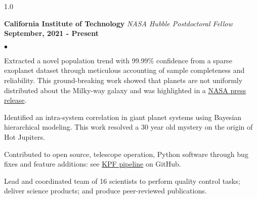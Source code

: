 \documentclass[margin,line, 12pt]{res}
\newenvironment{list2}{
  \begin{list}{$\bullet$}{%
      \setlength{\itemsep}{0.05in}
      \setlength{\parsep}{0in} \setlength{\parskip}{0in}
      \setlength{\topsep}{0.0in} \setlength{\partopsep}{0in}
      \setlength{\leftmargin}{0.2in}}}{\end{list}}
\begin{document}
\begin{spacing}{1.0}
\begin{resume}

\textbf{California Institute of Technology} \hfill \newline
\textit{NASA Hubble Postdoctoral Fellow} \hfill \textbf{September, 2021 - Present}\newline
    \begin{list2}
    	\vspace*{-5mm}
    	\item Extracted a novel population trend with 99.99\% confidence from a sparse exoplanet dataset through meticulous accounting of sample completeness and reliability. This ground-breaking work showed that planets are not uniformly distributed about the Milky-way galaxy and was highlighted in a \href{https://exoplanets.nasa.gov/news/1768/discovery-alert-on-our-galaxys-outskirts-a-poverty-of-planets/}{NASA press release}.
	
	\item Identified an intra-system correlation in giant planet systems using Bayesian hierarchical modeling. This work resolved a 30 year old mystery on the origin of Hot Jupiters.
	    	
	\item Contributed to open source, telescope operation, Python software through bug fixes and feature additions: see \href{https://github.com/California-Planet-Search/KPF-CPS}{KPF pipeline} on GitHub.
	
	\item Lead and coordinated team of 16 scientists to perform quality control tasks; deliver science products; and produce peer-reviewed publications.

	
	\end{list2}		
	

\end{resume}
\end{spacing}
\end{document}
